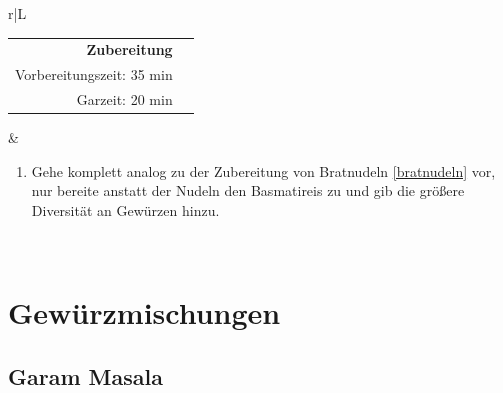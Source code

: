 \documentclass[a4paper, 12pt]{scrbook} 								%
\numberwithin{equation}{section} 									%
\begin{document}
\begin{tabularx}{\textwidth}{r|L}
		
			\begin{tabular}[t]{rr}
				\textbf{Zubereitung}	\\
				\small Vorbereitungszeit: 35 min	\\
				\small Garzeit:	20 min		\\
			\end{tabular}			&	\begin{enumerate}[]
											\item Gehe komplett analog zu der Zubereitung von Bratnudeln \ref{bratnudeln} vor, nur bereite anstatt der Nudeln den Basmatireis zu und gib die größere Diversität an Gewürzen hinzu.
										\end{enumerate}	\\
		\end{tabularx}
		\newpage



\chapter{Gewürzmischungen}

\newpage


	\section{Garam Masala}	\label{garam_masala}
\end{document}

